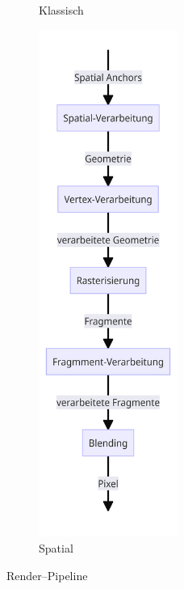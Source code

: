 \begin{figure}[ht!]
\begin{subfigure}{0.5\textwidth}
        \caption{Klassisch~\autocite{visualcomputingwh-2023}}
    \end{subfigure}%
    \begin{subfigure}{0.5\textwidth}
        \label{subfig:render-pipeline-spatial}
        \centering
        \includegraphics[width=0.5\textwidth]{../assets/img/spatial_render_pipline}
        \caption{Spatial}
    \end{subfigure}
    \caption{Render--Pipeline}
\end{figure}
